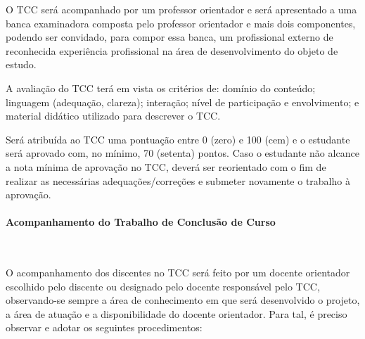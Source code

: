 
O TCC será acompanhado por um professor orientador e será apresentado a uma banca examinadora composta pelo professor orientador e mais dois componentes, podendo ser convidado, para compor essa banca, um profissional externo de reconhecida experiência profissional na área de desenvolvimento do objeto de estudo.

A avaliação do TCC terá em vista os critérios de: domínio do conteúdo; linguagem (adequação, clareza); interação; nível de participação e envolvimento; e material didático utilizado para descrever o TCC.

Será atribuída ao TCC uma pontuação entre 0 (zero) e 100 (cem) e o estudante será aprovado com, no mínimo, 70 (setenta) pontos. Caso o estudante não alcance a nota mínima de aprovação no TCC, deverá ser reorientado com o fim de realizar as necessárias adequações/correções e submeter novamente o trabalho à aprovação.

\paragraph{Acompanhamento do Trabalho de Conclusão de Curso}\

O acompanhamento dos discentes no TCC será feito por um docente orientador escolhido pelo discente ou designado pelo docente responsável pelo TCC, observando-se sempre a área de conhecimento em que será desenvolvido o projeto, a área de atuação e a disponibilidade do docente orientador. Para tal, é preciso observar e adotar os seguintes procedimentos:

